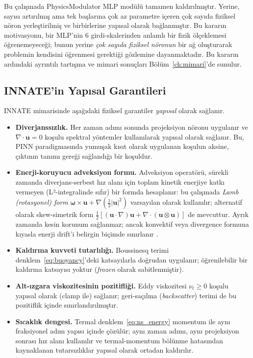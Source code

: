 Bu çalışmada PhysicsModulator MLP modülü tamamen kaldırılmıştır. Yerine, sayısı artırılmış ama tek başlarına çok az parametre içeren çok sayıda fiziksel nöron yerleştirilmiş ve birbirlerine yapısal olarak bağlanmıştır. Bu kararın motivasyonu, bir MLP'nin 6 girdi-skalerinden anlamlı bir fizik ölçeklemesi öğrenemeyeceği; bunun yerine \emph{çok sayıda fiziksel nöronun} bir ağ oluşturarak problemin kendisini öğrenmesi gerektiği gözlemine dayanmaktadır. Bu kararın ardındaki ayrıntılı tartışma ve mimari sonuçları Bölüm~\ref{ch:mimari}'de sunulur.

\subsection{INNATE'in Yapısal Garantileri}

INNATE mimarisinde aşağıdaki fiziksel garantiler \emph{yapısal} olarak sağlanır.

\begin{itemize}
  \item \textbf{Diverjanssızlık.} Her zaman adımı sonunda projeksiyon nöronu uygulanır ve $\nabla\cdot\mathbf{u}=0$ koşulu spektral yöntemler kullanılarak yapısal olarak sağlanır. Bu, PINN paradigmasında yumuşak kısıt olarak uygulanan koşulun aksine, çıktının tanımı gereği sağlandığı bir koşuldur.

  \item \textbf{Enerji-koruyucu adveksiyon formu.} Adveksiyon operatörü, sürekli zamanda diverjans-serbest hız alanı için toplam kinetik enerjiye katkı vermeyen (L²-integralinde sıfır) bir formda hesaplanır: bu çalışmada \emph{Lamb (rotasyonel) form} $\boldsymbol{\omega}\times\mathbf{u}+\nabla(\tfrac{1}{2}|\mathbf{u}|^{2})$ varsayılan olarak kullanılır; alternatif olarak skew-simetrik form $\tfrac{1}{2}[(\mathbf{u}\cdot\nabla)\mathbf{u}+\nabla\cdot(\mathbf{u}\otimes\mathbf{u})]$ de mevcuttur. Ayrık zamanda kesin korunum sağlanmaz; ancak konvektif veya divergence formuna kıyasla enerji drift'i belirgin biçimde sınırlanır \cite{morinishi_skew_1998}.

  \item \textbf{Kaldırma kuvveti tutarlılığı.} Boussinesq terimi denklem~\eqref{eq:buoyancy}'deki katsayılarla doğrudan uygulanır; öğrenilebilir bir kaldırma katsayısı yoktur (\textit{frozen} olarak sabitlenmiştir).

  \item \textbf{Alt-ızgara viskozitesinin pozitifliği.} Eddy viskozitesi $\nu_{t}\geq 0$ koşulu yapısal olarak (clamp ile) sağlanır; geri-saçılma (\textit{backscatter}) terimi de bu pozitiflik içinde sınırlandırılmıştır.

  \item \textbf{Sıcaklık dengesi.} Termal denklem~\eqref{eq:ns_energy} momentum ile aynı fraksiyonel adım yapısı içinde çözülür; aynı zaman adımı, aynı projeksiyon sonrası hız alanı kullanılır ve termal-momentum bölünme hatasından kaynaklanan tutarsızlıklar yapısal olarak ortadan kaldırılır.
\end{itemize}

